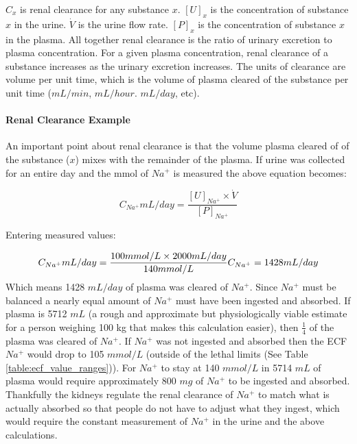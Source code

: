 $C_x$ is renal clearance for any substance $x$. $[U]_x$ is the concentration of substance $x$ in the urine. $\dot{V}$ is the urine flow rate. $[P]_x$ is the concentration of substance $x$ in the plasma. All together renal clearance is the ratio of urinary excretion to plasma concentration. For a given plasma concentration, renal clearance of a substance increases as the urinary excretion increases. The units of clearance are volume per unit time, which is the volume of plasma cleared of the substance per unit time ($mL/min$, $mL/hour$. $mL/day$, etc).

\paragraph{Renal Clearance Example}

An important point about renal clearance is that the volume plasma cleared of of the substance ($x$) mixes with the remainder of the plasma. If urine was collected for an entire day and the mmol of $Na^+$ is measured the above equation becomes:

\begin{equation}
    C_{Na^+} mL/day = \frac{[U]_{Na^+} \times \dot{V}}{[P]_{Na^+}}
    \label{Na_Clearance}
\end{equation}

Entering measured values:

\begin{equation}
    C_{Na^+} mL/day = \frac{100 mmol/L \times 2000 mL/day}{140 mmol/L} \\
    C_{Na^+} = 1428 mL/day
    \label{Na_Clearance_Example}
\end{equation}
Which means 1428 $mL/day$ of plasma was cleared of $Na^+$. Since $Na^+$ must be balanced a nearly equal amount of $Na^+$ must have been ingested and absorbed. If plasma is 5712 $mL$ (a rough and approximate but physiologically viable estimate for a person weighing 100 kg that makes this calculation easier), then $\frac{1}{4}$ of the plasma was cleared of $Na^+$. If $Na^+$ was not ingested and absorbed then the ECF $Na^+$ would drop to 105 $mmol/L$ (outside of the lethal limits (See Table \ref{table:ecf_value_ranges})). For $Na^+$ to stay at 140 $mmol/L$ in 5714 $mL$ of plasma would require approximately 800 $mg$ of $Na^+$ to be ingested and absorbed.\footnotemark{}
Thankfully the kidneys regulate the renal clearance of $Na^+$ to match what is actually absorbed so that people do not have to adjust what they ingest, which would require the constant measurement of $Na^+$ in the urine and the above calculations.

